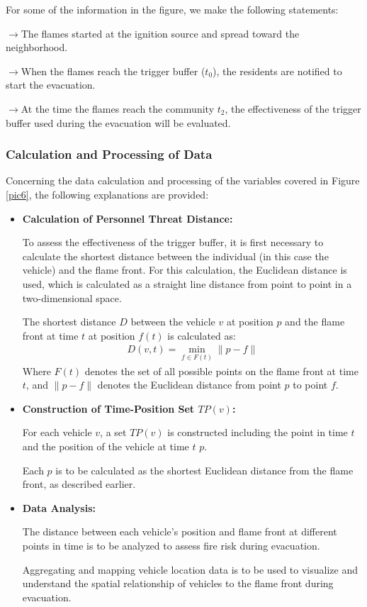 \documentclass[12pt]{article}  %
\begin{document}
 For some of the information in the figure, we make the following statements:
 
 $\rightarrow$The flames started at the ignition source and spread toward the neighborhood.
 
 $\rightarrow$When the flames reach the trigger buffer (\( t_0 \)), the residents are notified to start the evacuation.
 
 $\rightarrow$At the time the flames reach the community \( t_2 \), the effectiveness of the trigger buffer used during the evacuation will be evaluated.
 
 \subsubsection*{Calculation and Processing of Data}
 Concerning the data calculation and processing of the variables covered in Figure \ref{pic6}, the following explanations are provided:
  \begin{itemize}
 	\setlength{\parsep}{0ex} 
 	\setlength{\topsep}{2ex} 
 	\setlength{\itemsep}{1ex} 
 	\item \textbf{Calculation of Personnel Threat Distance:}  
 	
 	To assess the effectiveness of the trigger buffer, it is first necessary to calculate the shortest distance between the individual (in this case the vehicle) and the flame front. For this calculation, the Euclidean distance is used, which is calculated as a straight line distance from point to point in a two-dimensional space.
 	
 	The shortest distance \(D \) between the vehicle \(v \) at position \(p \) and the flame front at time \(t \) at position \(f(t) \) is calculated as:
 	\begin{equation}
 		\begin{aligned}
 			D(v, t) = \min_{f \in F(t)} \| p - f \| 
 		\end{aligned}
 	\end{equation}
 	Where \(F(t) \) denotes the set of all possible points on the flame front at time \(t \), and \(\| p - f \| \) denotes the Euclidean distance from point \(p \) to point \(f \).
 	
 	\item \textbf{Construction of Time-Position Set \( TP(v) \):} 
 	
 	For each vehicle \(v\), a set \(TP(v)\) is constructed including the point in time \(t\) and the position of the vehicle at time \(t\) \(p\).
 	
 	Each \(p\) is to be calculated as the shortest Euclidean distance from the flame front, as described earlier.
 	
 	
 	\item \textbf{Data Analysis:}  
 	
 	The distance between each vehicle's position and flame front at different points in time is to be analyzed to assess fire risk during evacuation.
 	
 	Aggregating and mapping vehicle location data is to be used to visualize and understand the spatial relationship of vehicles to the flame front during evacuation.
 	
 \end{itemize}
 
\end{document}
